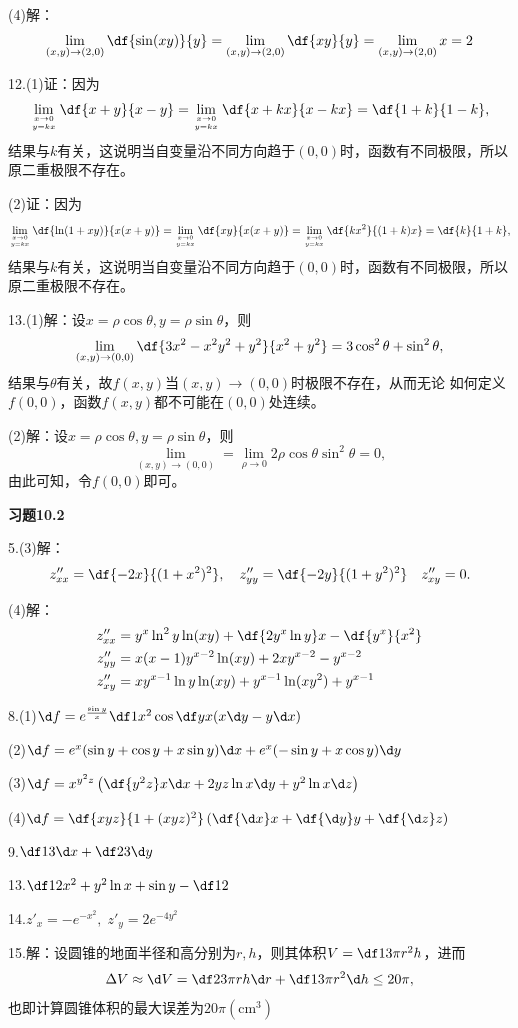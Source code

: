 (4)\;解：
$$
	\lim\limits_{(x,y)\to(2,0)}\df{\sin(xy)}{y}
	=\lim\limits_{(x,y)\to(2,0)}\df{xy}{y}
	=\lim\limits_{(x,y)\to(2,0)}x=2
$$

12.(1)\;证：因为
$$
	\lim\limits_{x\to 0\atop{y=kx}}\df{x+y}{x-y}
	=\lim\limits_{x\to 0\atop{y=kx}}\df{x+kx}{x-kx}=\df{1+k}{1-k},
$$
结果与$k$有关，这说明当自变量沿不同方向趋于$(0,0)$时，函数有不同极限，所以
原二重极限不存在。

(2)\;证：因为
$$
	\lim\limits_{x\to 0\atop{y=kx}}\df{\ln(1+xy)}{x(x+y)}
	=\lim\limits_{x\to 0\atop{y=kx}}\df{xy}{x(x+y)}
	=\lim\limits_{x\to 0\atop{y=kx}}\df{kx^2}{(1+k)x}=\df{k}{1+k},
$$
结果与$k$有关，这说明当自变量沿不同方向趋于$(0,0)$时，函数有不同极限，所以
原二重极限不存在。

13.(1)\;解：设$x=\rho\cos\theta,y=\rho\sin\theta$，则
$$
	\lim\limits_{(x,y)\to(0,0)}\df{3x^2-x^2y^2+y^2}{x^2+y^2}
	=3\cos^2\theta+\sin^2\theta,
$$
结果与$\theta$有关，故$f(x,y)$当$(x,y)\to(0,0)$时极限不存在，从而无论
如何定义$f(0,0)$，函数$f(x,y)$都不可能在$(0,0)$处连续。

(2)\;解：设$x=\rho\cos\theta,y=\rho\sin\theta$，则
$$
	\lim\limits_{(x,y)\to(0,0)}=\lim\limits_{\rho\to0}
	2\rho\cos\theta\sin^2\theta=0,
$$
由此可知，令$f(0,0)$即可。

{\bf 习题10.2}

5.(3)\;解：
$$z''_{xx}=\df{-2x}{(1+x^2)^2},\quad
z''_{yy}=\df{-2y}{(1+y^2)^2}\quad
z''_{xy}=0.$$

(4)\;解：
\begin{align*}
	z''_{xx}&=y^x\ln^2y\ln(xy)+\df{2y^x\ln y}x-\df{y^x}{x^2}\\
	z''_{yy}&=x(x-1)y^{x-2}\ln(xy)+2xy^{x-2}-y^{x-2}\\
	z''_{xy}&=xy^{x-1}\ln y\ln(xy)+y^{x-1}\ln(xy^2)+y^{x-1}
\end{align*}

8.\;(1)$\d f=e^{\frac{\sin y}x}\df1{x^2}\cos\df yx(x\d y-y\d x)$

(2)$\d f=e^x(\sin y+\cos y+x\sin y)\d x+e^x(-\sin y+x\cos y)\d y$

(3)$\d f=x^{y^2z}\left(\df{y^2z}x\d x+2yz\ln x\d y+y^2\ln x\d z\right)$

(4)$\d f=\df{xyz}{1+(xyz)^2}\left(\df{\d x}x+\df{\d y}y+\df{\d z}z\right)$

9.\;$\df13\d x+\df23\d y$

13.\;$\df12x^2+y^2\ln x+\sin y-\df12$

14.\;$z'_x=-e^{-x^2},\;z'_y=2e^{-4y^2}$

15.\;解：设圆锥的地面半径和高分别为$r,h$，则其体积$V=\df13\pi r^2h$，进而
$$\Delta V\approx\d V=\df23\pi rh\d r+\df13\pi r^2\d h\leq 20\pi,$$
也即计算圆锥体积的最大误差为$20\pi(\mathrm{cm}^3)$

